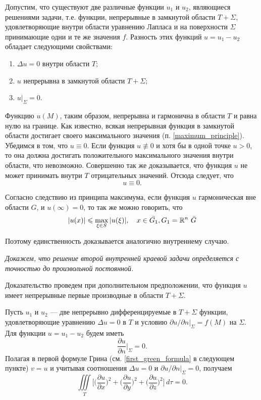 Допустим, что существуют две различные функции $u_1$ и $u_2$, являющиеся решениями задачи, т.е. функции, непрерывные в замкнутой области $T + \Sigma$, удовлетворяющие внутри области уравнению Лапласа и на поверхности $\Sigma$ принимающие одни и те же значения $f$. Разность этих функций $u = u_1 - u_2$ обладает следующими свойствами:
\begin{enumerate}
	\item $\Delta u = 0$ внутри области $T$;
	
	\item $u$ непрерывна в замкнутой области $T + \Sigma$;
	
	\item $u|_{\Sigma} = 0.$
\end{enumerate}

Функцию $u(M)$, таким образом, непрерывна и гармонична в области $T$ и равна нулю на границе. Как известно, всякая непрерывная функция в замкнутой области достигает своего максимального значения (п. \ref{maximum_principle}). Убедимся в том, что $u \equiv 0$. Если функция $u \not \equiv 0$ и хотя бы в одной точке $u > 0$, то она должна достигать положительного максимального значения внутри области, что невозможно. Совершенно так же доказывается, что функция $u$ не может принимать внутри $T$ отрицательных значений. Отсюда следует, что 
\begin{equation*}
	u \equiv 0.
\end{equation*}

Согласно следствию из принципа максимума, если функция $u$ гармоническая вне области $G$, и $u(\infty) = 0$, то так же можно говорить, что 
\begin{equation*}
	\abs{u(x)} \leqslant \max\limits_{\xi \in S}{\abs{u(\xi)}}, \quad x \in \bar{G_1}, G_1 = \mathbb{R}^n \ \bar{G}  
\end{equation*}

Поэтому единственность доказывается аналогично внутреннему случаю. 

\textit{Докажем, что решение второй внутренней краевой задачи определяется с точностью до произвольной постоянной.}

Доказательство проведем при дополнительном предположении, что функция $u$ имеет непрерывные первые производные в области $T + \Sigma$. 

Пусть $u_1$ и $u_2$ --- две непрерывно дифференцируемые в $T + \Sigma$ функции, удовлетворяющие уравнению $\Delta u = 0$ в $T$ и условию $\partial u/ \partial n |_{\Sigma} = f(M)$ на $\Sigma$. Для функции $u = u_1 - u_2$ будем иметь 
\begin{equation*}
	\frac{\partial u}{\partial n} \Big|_{\Sigma} = 0.
\end{equation*}
Полагая в первой формуле Грина (см. \eqref{first_green_formula} в следующем пункте) $v = u$ и учитывая соотношения $\Delta u = 0$ и $\partial u / \partial n |_{\Sigma} = 0$, получаем 
\begin{equation*}
	 \iiint \limits_{T} \Bigg[\Bigg(\frac{\partial u}{\partial x}\Bigg)^2 + \Bigg(\frac{\partial u}{\partial y}\Bigg)^2 + \Bigg(\frac{\partial u}{\partial z}\Bigg)^2\Bigg] \, d\tau = 0.
\end{equation*}

